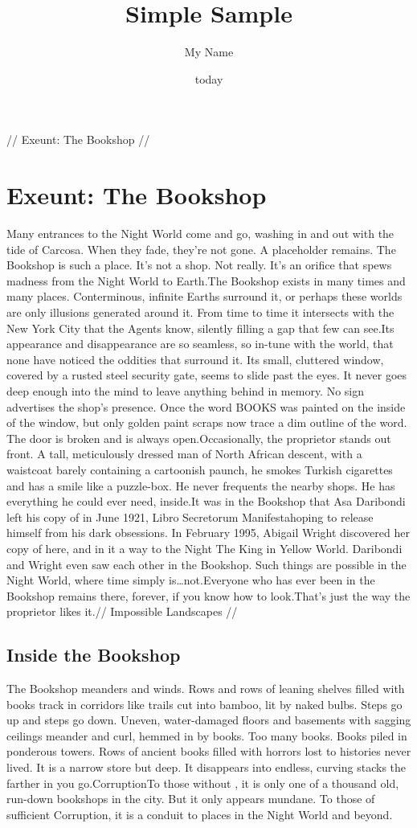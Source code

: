 \documentclass{report}
\title{Simple Sample} %
\author{My Name} %
\date{today} %
\begin{document}
\tableofcontents
\newpage// Exeunt: The Bookshop //
\chapter{Exeunt: The Bookshop}
\begin{multicols}{2}
Many entrances to the Night World come and go, washing in and out with the tide of Carcosa. When they fade, they're not gone. A placeholder remains. The Bookshop is such a place. It's not a shop. Not really. It's an orifice that spews madness from the Night World to Earth.The Bookshop exists in many times and many places. Conterminous, infinite Earths surround it, or perhaps these worlds are only illusions generated around it. From time to time it intersects with the New York City that the Agents know, silently filling a gap that few can see.Its appearance and disappearance are so seamless, so in-tune with the world, that none have noticed the oddities that surround it. Its small, cluttered window, covered by a rusted steel security gate, seems to slide past the eyes. It never goes deep enough into the mind to leave anything behind in memory. No sign advertises the shop's presence. Once the word BOOKS was painted on the inside of the window, but only golden paint scraps now trace a dim outline of the word. The door is broken and is always open.Occasionally, the proprietor stands out front. A tall, meticulously dressed man of North African descent, with a waistcoat barely containing a cartoonish paunch, he smokes Turkish cigarettes and has a smile like a puzzle-box. He never frequents the nearby shops. He has everything he could ever need, inside.It was in the Bookshop that Asa Daribondi left his copy of  in June 1921, Libro Secretorum Manifestahoping to release himself from his dark obsessions. In February 1995, Abigail Wright discovered her copy of here, and in it a way to the Night The King in Yellow World. Daribondi and Wright even saw each other in the Bookshop. Such things are possible in the Night World, where time simply is…not.Everyone who has ever been in the Bookshop remains there, forever, if you know how to look.That's just the way the proprietor likes it.// Impossible Landscapes //
\section{Inside the Bookshop}
The Bookshop meanders and winds. Rows and rows of leaning shelves filled with books track in corridors like trails cut into bamboo, lit by naked bulbs. Steps go up and steps go down. Uneven, water-damaged floors and basements with sagging ceilings meander and curl, hemmed in by books. Too many books. Books piled in ponderous towers. Rows of ancient books filled with horrors lost to histories never lived. It is a narrow store but deep. It disappears into endless, curving stacks the farther in you go.CorruptionTo those without , it is only one of a thousand old, run-down bookshops in the city. But it only appears mundane. To those of sufficient Corruption, it is a conduit to places in the Night World and beyond.

\end{multicols}
\end{document}
